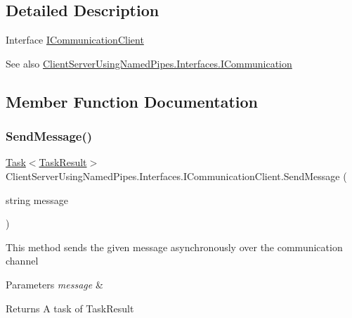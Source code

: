 \subsection{Detailed Description}
Interface \hyperlink{interface_client_server_using_named_pipes_1_1_interfaces_1_1_i_communication_client}{I\+Communication\+Client} 

\begin{DoxySeeAlso}{See also}
\hyperlink{interface_client_server_using_named_pipes_1_1_interfaces_1_1_i_communication}{Client\+Server\+Using\+Named\+Pipes.\+Interfaces.\+I\+Communication}


\end{DoxySeeAlso}


\subsection{Member Function Documentation}
\mbox{\label{interface_client_server_using_named_pipes_1_1_interfaces_1_1_i_communication_client_a07c2acf92bd0b99d704156010b47eff1}} 
\subsubsection{\texorpdfstring{Send\+Message()}{SendMessage()}}
{\footnotesize\ttfamily \hyperlink{class_system_1_1_threading_1_1_tasks_1_1_task}{Task}$<$\hyperlink{class_client_server_using_named_pipes_1_1_utilities_1_1_task_result}{Task\+Result}$>$ Client\+Server\+Using\+Named\+Pipes.\+Interfaces.\+I\+Communication\+Client.\+Send\+Message (\begin{DoxyParamCaption}\item[{string}]{message }\end{DoxyParamCaption})}



This method sends the given message asynchronously over the communication channel 


\begin{DoxyParams}{Parameters}
{\em message} & \\
\hline
\end{DoxyParams}
\begin{DoxyReturn}{Returns}
A task of Task\+Result
\end{DoxyReturn}


